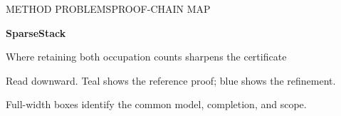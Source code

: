 \documentclass[11pt]{article}
\numberwithin{equation}{section}
\theoremstyle{definition}\newtheorem{definition}[theorem]{Definition}
\theoremstyle{remark}\newtheorem{remark}[theorem]{Remark}
\begin{document}
\thispagestyle{empty}
{\sffamily\color{Navy}\small METHOD PROBLEMS\hfill PROOF-CHAIN MAP\par}
\vspace{3mm}
{\sffamily\bfseries\fontsize{24}{28}\selectfont SparseStack\par}
\vspace{1.5mm}
{\sffamily\large Where retaining both occupation counts sharpens the certificate\par}
\vspace{2mm}
{\small Read downward. Teal shows the reference proof; blue shows the refinement.\par
Full-width boxes identify the common model, completion, and scope.\par}
\vspace{2mm}

\newlength{\ProofFullWidth}
\setlength{\ProofFullWidth}{\dimexpr\textwidth-16pt\relax}
\newlength{\ProofColumnWidth}
\setlength{\ProofColumnWidth}{.5\textwidth}
\addtolength{\ProofColumnWidth}{-5mm}
\addtolength{\ProofColumnWidth}{-14pt}
\newlength{\ProofColumnOffset}
\setlength{\ProofColumnOffset}{.25\textwidth}
\addtolength{\ProofColumnOffset}{2.5mm}
\end{document}
